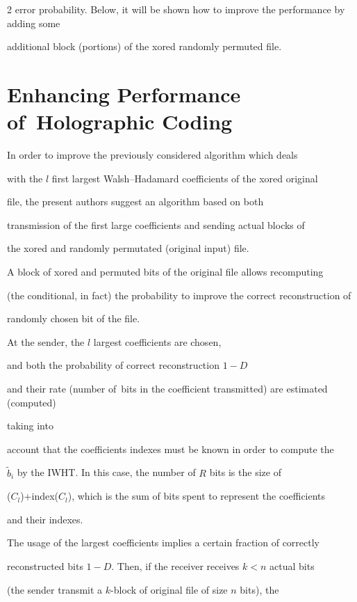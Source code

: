 \begin{multicols}{2}
error probability. Below, it will be shown how to improve the performance by adding some 

additional block (portions) of the xored randomly permuted file.





\section{Enhancing Performance of~Holographic Coding}



\noindent In order to improve the previously considered algorithm which deals 

with  the $l$ first largest Walsh--Hadamard  coefficients of the xored original 

file,  the present authors suggest  an algorithm  based on both 

transmission of the first large coefficients and sending actual blocks of 

the xored and randomly permutated  (original input) file.

A block of xored and permuted bits of the original file allows recomputing 

 (the conditional, in fact) the probability to improve the correct reconstruction of  

 randomly chosen bit of the file.

 At the sender, the  $l$ largest coefficients are chosen, 

 and  both the probability of correct reconstruction $1-D$ 

 and their rate (number of\ bits in the coefficient transmitted) are estimated (computed)

 taking into 

 account that the coefficients indexes must be known in order to compute the 

 $\tilde b_i$ by the IWHT. In this case, the number of $R$ bits is the size of 

 ($C_l$)+index($C_l$), which  is the sum of bits spent to represent the coefficients 

 and their indexes.



The usage of the largest coefficients implies a certain  fraction of correctly 

reconstructed bits $1-D$. Then, if the receiver receives  $k<n$ actual bits 

(the sender transmit a $k$-block of original file of size $n$ bits), the 


\end{multicols}
